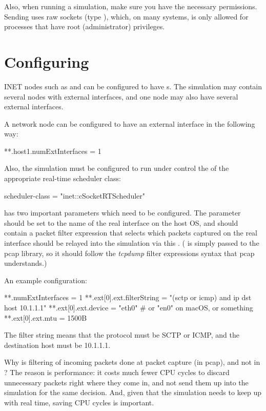 Also, when running a simulation, make sure you have the necessary permissions. 
Sending uses raw sockets (type ), which, on many systems,
is only allowed for processes that have root (administrator) privileges. 


\section{Configuring}

INET nodes such as  and  
can be configured to have s. 
The simulation may contain several nodes with external interfaces, 
and one node may also have several external interfaces.

A network node can be configured to have an external interface 
in the following way:  

\begin{inifile}
**.host1.numExtInterfaces = 1
\end{inifile}

Also, the simulation must be configured to run under control the of the
appropriate real-time scheduler class:

\begin{inifile}
scheduler-class = "inet::cSocketRTScheduler"
\end{inifile}

 has two important parameters which need to be 
configured. The  parameter should be set to the name of the real
interface on the host OS, and  should contain a packet 
filter expression that selects which packets captured on the real interface 
should  be relayed into the simulation via this .
( is simply passed to the pcap library, so it should
follow the \textit{tcpdump} filter expressions syntax that pcap understands.)

An example configuration:

\begin{inifile}
**.numExtInterfaces = 1
**.ext[0].ext.filterString = "(sctp or icmp) and ip dst host 10.1.1.1"
**.ext[0].ext.device = "eth0" # or "en0" on macOS, or something 
**.ext[0].ext.mtu = 1500B
\end{inifile}

The filter string  means
that the protocol must be SCTP or ICMP, and the destination host must be
10.1.1.1.

\begin{note}
Why is filtering of incoming packets done at packet capture (in pcap), 
and not in ? The reason is performance: it costs
much fewer CPU cycles to discard unnecessary packets right where
they come in, and not send them up into the simulation for the
same decision. And, given that the simulation needs to keep up with 
real time, saving CPU cycles is important.
\end{note}

